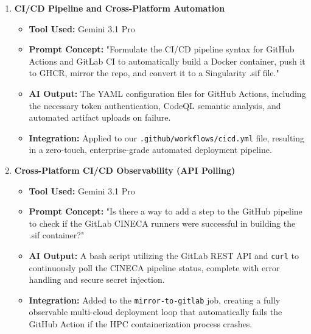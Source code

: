 \documentclass[11pt, a4paper]{article}
\begin{document}
\begin{enumerate}[label=\textbf{Topic \arabic*:}, align=left, leftmargin=0.5cm]
    \item \textbf{CI/CD Pipeline and Cross-Platform Automation}
    \begin{itemize}[label={}, leftmargin=0.5cm]
        \item \textbf{Tool Used:} Gemini 3.1 Pro
        \item \textbf{Prompt Concept:} "Formulate the CI/CD pipeline syntax for GitHub Actions and GitLab CI to automatically build a Docker container, push it to GHCR, mirror the repo, and convert it to a Singularity .sif file."
        \item \textbf{AI Output:} The YAML configuration files for GitHub Actions, including the necessary token authentication, CodeQL semantic analysis, and automated artifact uploads on failure.
        \item \textbf{Integration:} Applied to our \texttt{.github/workflows/cicd.yml} file, resulting in a zero-touch, enterprise-grade automated deployment pipeline.
    \end{itemize}
    \vspace{0.3cm}

    \item \textbf{Cross-Platform CI/CD Observability (API Polling)}
    \begin{itemize}[label={}, leftmargin=0.5cm]
        \item \textbf{Tool Used:} Gemini 3.1 Pro
        \item \textbf{Prompt Concept:} "Is there a way to add a step to the GitHub pipeline to check if the GitLab CINECA runners were successful in building the .sif container?"
        \item \textbf{AI Output:} A bash script utilizing the GitLab REST API and \texttt{curl} to continuously poll the CINECA pipeline status, complete with error handling and secure secret injection.
        \item \textbf{Integration:} Added to the \texttt{mirror-to-gitlab} job, creating a fully observable multi-cloud deployment loop that automatically fails the GitHub Action if the HPC containerization process crashes.
    \end{itemize}
    \vspace{0.3cm}


\end{enumerate}
\end{document}
